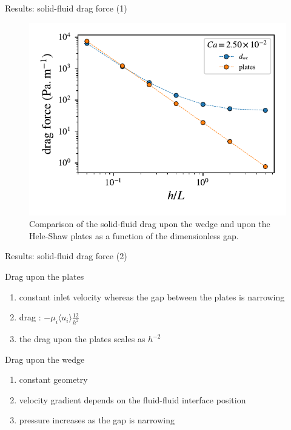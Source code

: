 \documentclass[presentation]{beamer}
\begin{document}
\begin{frame}[label={sec:orgb51f6ba}]{Results: solid-fluid drag force (1)}
\begin{figure}
\centering
\includegraphics[scale=0.8]{RESULTS_drag.pdf}
\caption{Comparison of the solid-fluid drag upon the wedge and upon the Hele-Shaw plates as a function of the
dimensionless gap.}
\end{figure}
\end{frame}

\begin{frame}[label={sec:orgeed5a19}]{Results: solid-fluid drag force (2)}
\begin{alertblock}{Drag upon the plates}
\begin{enumerate}
\item constant inlet velocity whereas the gap between the plates is narrowing
\item drag : $-\mu_i \langle u_i \rangle \frac{12}{h^2}$
\item the drag upon the plates scales as $h^{-2}$
\end{enumerate}
\end{alertblock}

\begin{exampleblock}{Drag upon the wedge}

\begin{enumerate}
\item constant geometry
\item velocity gradient depends on the fluid-fluid interface position
\item pressure increases as the gap is narrowing
\end{enumerate}

\end{exampleblock}
\end{frame}
\end{document}
